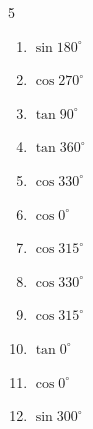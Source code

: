 \begin{multicols}{5}
\begin{enumerate}

  \item $\displaystyle \sin{180^\circ}$

        \phantom{$\displaystyle =0$}

  \item $\displaystyle \cos{270^\circ}$

        \phantom{$\displaystyle =0$}

\columnbreak %

\resetques

  \item $\displaystyle \tan{90^\circ}$

        \phantom{$\displaystyle なし$}

  \item $\displaystyle \tan{360^\circ}$

        \phantom{$\displaystyle =0$}

  \item $\displaystyle \cos{330^\circ}$


  \item $\displaystyle \cos{0^\circ}$

        \phantom{$\displaystyle =1$}

  \item $\displaystyle \cos{315^\circ}$


  \item $\displaystyle \cos{330^\circ}$


  \item $\displaystyle \cos{315^\circ}$


  \item $\displaystyle \tan{0^\circ}$

        \phantom{$\displaystyle =0$}

  \item $\displaystyle \cos{0^\circ}$

        \phantom{$\displaystyle =1$}

  \item $\displaystyle \sin{300^\circ}$



\end{enumerate}
\end{multicols}
